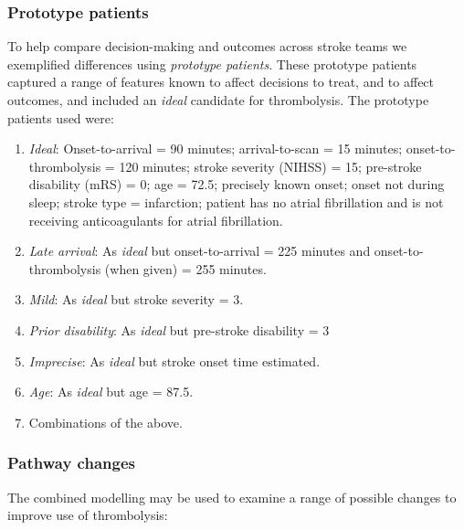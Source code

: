 \subsubsection{Prototype patients}

To help compare decision-making and outcomes across stroke teams we exemplified differences using \textit{prototype patients}. These prototype patients captured a range of features known to affect decisions to treat, and to affect outcomes, and included an \textit{ideal} candidate for thrombolysis. The prototype patients used were:

\begin{enumerate}
    \item \textit{Ideal}: Onset-to-arrival = 90 minutes; arrival-to-scan = 15 minutes; onset-to-thrombolysis = 120 minutes; stroke severity (NIHSS) = 15; pre-stroke disability (mRS) = 0; age = 72.5; precisely known onset; onset not during sleep; stroke type = infarction; patient has no atrial fibrillation and is not receiving anticoagulants for atrial fibrillation.

    \item \textit{Late arrival}: As \textit{ideal} but onset-to-arrival = 225 minutes and onset-to-thrombolysis (when given) = 255 minutes.

    \item \textit{Mild}: As \textit{ideal} but stroke severity = 3.

    \item \textit{Prior disability}: As \textit{ideal} but pre-stroke disability = 3

    \item \textit{Imprecise}: As \textit{ideal} but stroke onset time estimated.

    \item \textit{Age}: As \textit{ideal} but age = 87.5.

    \item Combinations of the above.
\end{enumerate}


\subsubsection{Pathway changes}

The combined modelling may be used to examine a range of possible changes to improve use of thrombolysis:

